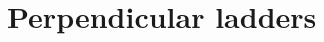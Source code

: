 \documentclass[a4paper,11pt]{article}
\begin{document}


\section{Perpendicular ladders}				
\label{sec:perpendciular}



  
\end{document}

